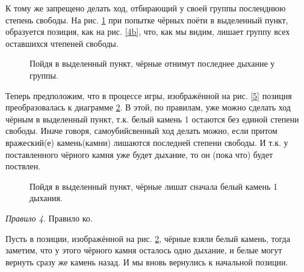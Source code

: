 \documentclass[14pt,a4paper]{extarticle}
\newcommand{\stone}[3]{\filldraw[color=black, fill=#3, very thick](#1,#2) circle(0.45);}
\newcommand{\territory}[3]{\filldraw[color=black, fill=#3, very thick](#1, #2) circle(0.125);}
\newcommand{\stonelabel}[4]{\node[text=#3] at (#1,#2) {#4};}
\begin{document}
К тому же запрещено делать ход, отбирающий у своей группы посленднюю степень свободы. На рис. \ref{6} при попытке чёрных поёти в выделенный пункт, образуется позиция, как на рис. \ref{4b}, что, как мы видим, лишает группу всех оставшихся чтепеней свободы.


\newpage


\begin{figure}[h!]
\centering
{}

\caption{Пойдя в выделенный пункт, чёрные отнимут последнее дыхание у группы.}
\label{6}
\end{figure}
Теперь предположим, что в процессе игры, изображённой на рис. \ref{5} позиция преобразовалась к диаграмме \ref{7}. В этой, по правилам, уже можно сделать ход чёрным в выделенный пункт, т.к. белый камень 1 остаются без единой степени свободы. Иначе говоря, самоубийсвенный ход делать можно, если притом вражеский(е) камень(камни) лишаются последней степени свободы. И т.к. у поставленного чёрного камня уже будет дыхание, то он (пока что) будет поствлен.

\begin{figure}[h!]
    \centering
    \caption{Пойдя в выделенный пункт, чёрные лишат сначала белый камень 1 дыхания.}
    \label{7}
\end{figure}

\textit{Правило 4.} Правило ко.

Пусть в позиции, изображённой на рис. \ref{7}, чёрные взяли белый камень, тогда заметим, что у этого чёрного камня осталось одно дыхание, и белые могут вернуть сразу же камень назад. И мы вновь вернулись к начальной позиции.
\end{document}
